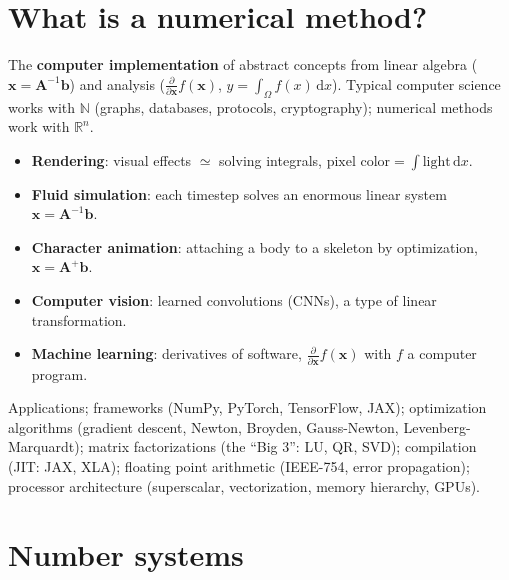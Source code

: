 \documentclass[11pt,a4paper,openany]{book}
\begin{document}
\section{What is a numerical method?}

\begin{defnbox}[title=CS-328]
The \textbf{computer implementation} of abstract concepts from linear algebra
($\mathbf{x} = \mathbf{A}^{-1}\mathbf{b}$) and analysis
($\frac{\partial}{\partial \mathbf{x}} f(\mathbf{x})$, $y = \int_\Omega f(x)\,\mathrm{d}x$).
Typical computer science works with $\mathbb{N}$ (graphs, databases, protocols, cryptography);
numerical methods work with $\mathbb{R}^n$.
\end{defnbox}

\begin{exbox}[title=Numerical methods everywhere]
\begin{itemize}
  \item \textbf{Rendering}: visual effects $\simeq$ solving integrals,
        $\text{pixel color} = \int \text{light}\,\mathrm{d}x$.
  \item \textbf{Fluid simulation}: each timestep solves an enormous linear system
        $\mathbf{x} = \mathbf{A}^{-1}\mathbf{b}$.
  \item \textbf{Character animation}: attaching a body to a skeleton by optimization,
        $\mathbf{x} = \mathbf{A}^{+}\mathbf{b}$.
  \item \textbf{Computer vision}: learned convolutions (CNNs), a type of linear transformation.
  \item \textbf{Machine learning}: derivatives of software,
        $\frac{\partial}{\partial \mathbf{x}} f(\mathbf{x})$ with $f$ a computer program.
\end{itemize}
\end{exbox}

\begin{propbox}[title=Many layers (top to bottom)]
Applications; frameworks (NumPy, PyTorch, TensorFlow, JAX); optimization algorithms (gradient
descent, Newton, Broyden, Gauss-Newton, Levenberg-Marquardt); matrix factorizations (the ``Big
3'': LU, QR, SVD); compilation (JIT: JAX, XLA); floating point arithmetic (IEEE-754, error
propagation); processor architecture (superscalar, vectorization, memory hierarchy, GPUs).
\end{propbox}


\section{Number systems}
\end{document}
